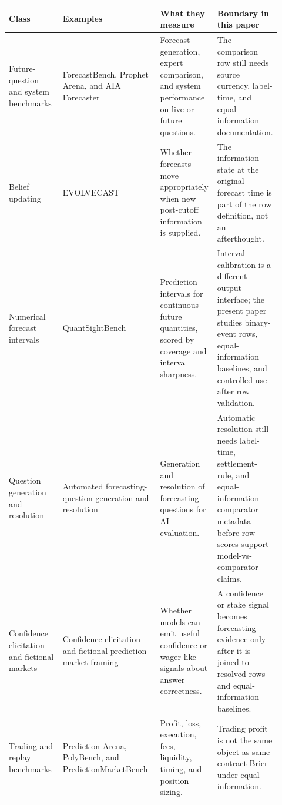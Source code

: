 \documentclass[11pt]{article}
\begin{document}
\begin{table}[p]
\centering
\begingroup
\setlength{\tabcolsep}{2pt}
\renewcommand{\arraystretch}{0.86}
\scriptsize
\begin{tabular}{@{}L{0.20\linewidth} L{0.28\linewidth} L{0.21\linewidth} L{0.23\linewidth}@{}}
\toprule
Class & Examples & What they measure & Boundary in this paper \\
\midrule
Future-question and system benchmarks & ForecastBench, Prophet Arena, and AIA Forecaster~\cite{karger2024forecastbench,yang2025prophetarena,alur2025aiaforecaster} & Forecast generation, expert comparison, and system performance on live or future questions. & The comparison row still needs source currency, label-time, and equal-information documentation. \\
Belief updating & EVOLVECAST~\cite{yuan2025evolvecast} & Whether forecasts move appropriately when new post-cutoff information is supplied. & The information state at the original forecast time is part of the row definition, not an afterthought. \\
Numerical forecast intervals & QuantSightBench~\cite{qin2026quantsightbench} & Prediction intervals for continuous future quantities, scored by coverage and interval sharpness. & Interval calibration is a different output interface; the present paper studies binary-event rows, equal-information baselines, and controlled use after row validation. \\
Question generation and resolution & Automated forecasting-question generation and resolution~\cite{bosse2026automatingforecasting} & Generation and resolution of forecasting questions for AI evaluation. & Automatic resolution still needs label-time, settlement-rule, and equal-information-comparator metadata before row scores support model-vs-comparator claims. \\
Confidence elicitation and fictional markets & Confidence elicitation and fictional prediction-market framing~\cite{xiong2024confidence,todasco2025fakepredictionmarkets} & Whether models can emit useful confidence or wager-like signals about answer correctness. & A confidence or stake signal becomes forecasting evidence only after it is joined to resolved rows and equal-information baselines. \\
Trading and replay benchmarks & Prediction Arena, PolyBench, and PredictionMarketBench~\cite{zhang2026predictionarena,cheng2026polybench,arora2026predictionmarketbench} & Profit, loss, execution, fees, liquidity, timing, and position sizing. & Trading profit is not the same object as same-contract Brier under equal information. \\

\end{tabular}
\end{table}
\end{document}
